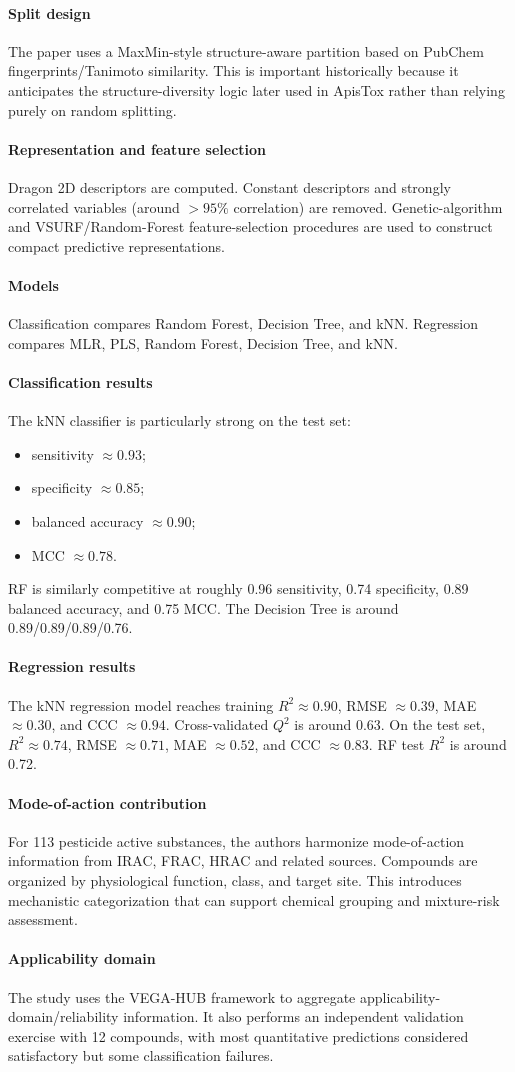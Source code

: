 \documentclass[11pt]{article}
\newcommand{\reviewfield}[2]{\paragraph{#1}#2}
\begin{document}
\reviewfield{Split design}{
The paper uses a MaxMin-style structure-aware partition based on PubChem fingerprints/Tanimoto similarity. This is important historically because it anticipates the structure-diversity logic later used in ApisTox rather than relying purely on random splitting.
}

\reviewfield{Representation and feature selection}{
Dragon 2D descriptors are computed. Constant descriptors and strongly correlated variables (around $>95\%$ correlation) are removed. Genetic-algorithm and VSURF/Random-Forest feature-selection procedures are used to construct compact predictive representations.
}

\reviewfield{Models}{
Classification compares Random Forest, Decision Tree, and kNN. Regression compares MLR, PLS, Random Forest, Decision Tree, and kNN.
}

\reviewfield{Classification results}{
The kNN classifier is particularly strong on the test set:
\begin{itemize}
    \item sensitivity $\approx0.93$;
    \item specificity $\approx0.85$;
    \item balanced accuracy $\approx0.90$;
    \item MCC $\approx0.78$.
\end{itemize}
RF is similarly competitive at roughly 0.96 sensitivity, 0.74 specificity, 0.89 balanced accuracy, and 0.75 MCC. The Decision Tree is around 0.89/0.89/0.89/0.76.
}

\reviewfield{Regression results}{
The kNN regression model reaches training $R^2\approx0.90$, RMSE $\approx0.39$, MAE $\approx0.30$, and CCC $\approx0.94$. Cross-validated $Q^2$ is around 0.63. On the test set, $R^2\approx0.74$, RMSE $\approx0.71$, MAE $\approx0.52$, and CCC $\approx0.83$. RF test $R^2$ is around 0.72.
}

\reviewfield{Mode-of-action contribution}{
For 113 pesticide active substances, the authors harmonize mode-of-action information from IRAC, FRAC, HRAC and related sources. Compounds are organized by physiological function, class, and target site. This introduces mechanistic categorization that can support chemical grouping and mixture-risk assessment.
}

\reviewfield{Applicability domain}{
The study uses the VEGA-HUB framework to aggregate applicability-domain/reliability information. It also performs an independent validation exercise with 12 compounds, with most quantitative predictions considered satisfactory but some classification failures.
}
\end{document}
